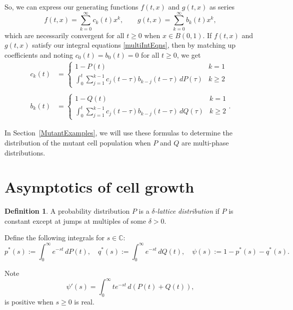 \documentclass[12pt]{amsart}
\theoremstyle{plain}
\theoremstyle{definition}
\newtheorem{defn}[thm]{Definition}
\theoremstyle{remark}
\theoremstyle{definition}
\begin{document}
So, we can express our generating functions $f(t,x)$ and $g(t,x)$ as series
\begin{equation}
f(t,x) = \sum_{k=0}^\infty c_k(t)x^k, \qquad g(t,x) = \sum_{k=0}^\infty b_k(t)x^k,
\end{equation}
which are necessarily convergent for all $t \geq 0 $ when $x \in B(0,1)$. If $f(t,x)$ and $g(t,x)$ satisfy our integral equations \eqref{multiIntEqns}, then by matching up coefficients and noting $c_0(t) = b_0(t) = 0$ for all $t \geq 0$, we get
\begin{equation}
\begin{aligned}
c_k(t) &= \begin{cases}
\displaystyle 1-P(t) & k=1 \\
\displaystyle \int_0^t \sum_{j=1}^{k-1} c_{j}(t-\tau)b_{k-j}(t-\tau) \, dP(\tau) & k\geq 2
\end{cases} \\
\\
b_k(t) &= \begin{cases}
\displaystyle 1-Q(t) & k=1 \\
\displaystyle \int_0^t \sum_{j=1}^{k-1} c_{j}(t-\tau)b_{k-j}(t-\tau) \, dQ(\tau) & k\geq 2
\end{cases}.
\end{aligned}
\end{equation}

In Section~\ref{MutantExamples}, we will use these formulas to determine the distribution of the mutant cell population when $P$ and $Q$ are multi-phase distributions.

\section{Asymptotics of cell growth} \label{asymptotics}

\begin{defn} \label{lattice}
A probability distribution $P$ is a \emph{$\delta$-lattice distribution} if $P$ is constant except at jumps at multiples of some $\delta > 0$.
\end{defn}

Define the following integrals for $s \in \mathbb C$:
\begin{equation}
p^*(s) := \int_0^\infty e^{-st} \, dP(t), \quad
q^*(s) := \int_0^\infty e^{-st} \, dQ(t), \quad
\psi(s) := 1 - p^*(s) - q^*(s).
\end{equation}

Note
\begin{equation}
\psi'(s) = \int_0^\infty te^{-st} \, d(P(t)+Q(t)),
\end{equation}
is positive when $s\ge 0$ is real.
\end{document}

